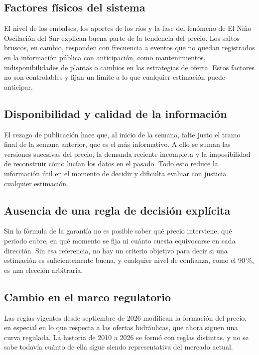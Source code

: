\documentclass[11pt,letterpaper]{article}
\begin{document}
\subsection{Factores físicos del sistema}

El nivel de los embalses, los aportes de los ríos y la fase del fenómeno
de El Niño--Oscilación del Sur explican buena parte de la tendencia del
precio. Los saltos bruscos, en cambio, responden con frecuencia a
eventos que no quedan registrados en la información pública con
anticipación, como mantenimientos, indisponibilidades de plantas o
cambios en las estrategias de oferta. Estos factores no son controlables
y fijan un límite a lo que cualquier estimación puede anticipar.

\subsection{Disponibilidad y calidad de la información}

El rezago de publicación hace que, al inicio de la semana, falte justo
el tramo final de la semana anterior, que es el más informativo. A ello
se suman las versiones sucesivas del precio, la demanda reciente
incompleta y la imposibilidad de reconstruir cómo lucían los datos en el
pasado. Todo esto reduce la información útil en el momento de decidir y
dificulta evaluar con justicia cualquier estimación.

\subsection{Ausencia de una regla de decisión explícita}

Sin la fórmula de la garantía no es posible saber qué precio interviene,
qué periodo cubre, en qué momento se fija ni cuánto cuesta equivocarse
en cada dirección. Sin esa referencia, no hay un criterio objetivo para
decir si una estimación es suficientemente buena, y cualquier nivel de
confianza, como el 90\,\%, es una elección arbitraria.

\subsection{Cambio en el marco regulatorio}

Las reglas vigentes desde septiembre de 2026 modifican la formación del
precio, en especial en lo que respecta a las ofertas hidráulicas, que
ahora siguen una curva regulada. La historia de 2010 a 2026 se formó con
reglas distintas, y no se sabe todavía cuánto de ella sigue siendo
representativa del mercado actual.
\end{document}
